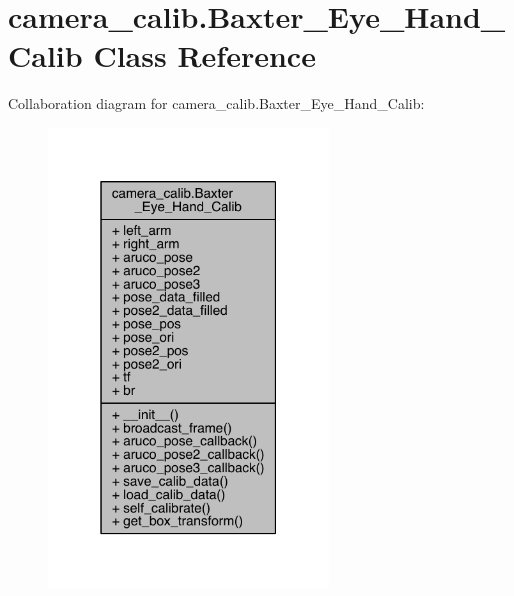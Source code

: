 \hypertarget{classcamera__calib_1_1_baxter___eye___hand___calib}{}\section{camera\+\_\+calib.\+Baxter\+\_\+\+Eye\+\_\+\+Hand\+\_\+\+Calib Class Reference}
\label{classcamera__calib_1_1_baxter___eye___hand___calib}


Collaboration diagram for camera\+\_\+calib.\+Baxter\+\_\+\+Eye\+\_\+\+Hand\+\_\+\+Calib\+:
\nopagebreak
\begin{figure}[H]
\begin{center}
\leavevmode
\includegraphics[width=211pt]{classcamera__calib_1_1_baxter___eye___hand___calib__coll__graph}
\end{center}
\end{figure}
